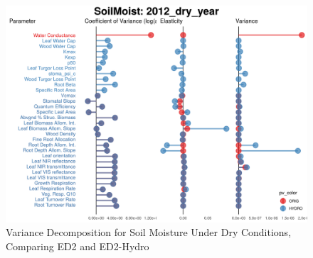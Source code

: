 \begin{figure}[!h]
    \centering
    \includegraphics[width=.8\textwidth]{Hydro_Paper_LaTeX/Hydro_Paper_Figures/VDC_SoilMoist_dry.png}
    \caption[Soil Moisture Variance Decomposition]{Variance Decomposition for Soil Moisture Under Dry Conditions, Comparing ED2 and ED2-Hydro}
    \label{fig:vdc_soilmoist}
\end{figure}